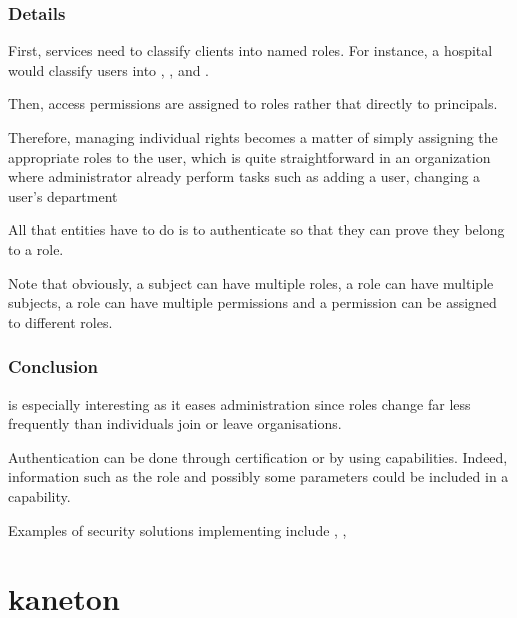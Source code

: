 
\begin{frame}
  \frametitle{Details}

  First, services need to classify clients into named roles. For instance,
  a hospital would classify users into , ,
   and .

  \-

  Then, access permissions are assigned to roles rather that directly to
  principals.

  \-

  Therefore, managing individual rights becomes a matter of simply assigning
  the appropriate roles to the user, which is quite straightforward in
  an organization where administrator already perform tasks such as adding
  a user, changing a user's department \etc{}

  \-

  All that entities have to do is to authenticate so that they can prove
  they belong to a role.

  \-

  Note that obviously, a subject can have multiple roles, a role can have
  multiple subjects, a role can have multiple permissions and a permission
  can be assigned to different roles.
\end{frame}


\begin{frame}
  \frametitle{Conclusion}

   is especially interesting as it eases administration since
  roles change far less frequently than individuals join or leave
  organisations.

  \-

  Authentication can be done through certification or by using capabilities.
  Indeed,  information such as the role and possibly some
  parameters could be included in a capability.

  \-

  Examples of security solutions implementing  include
  , ,  \etc{}
\end{frame}

%
%

\section{kaneton}

